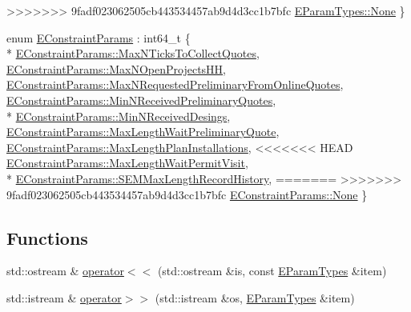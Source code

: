 \begin{DoxyCompactItemize}
>>>>>>> 9fadf023062505cb443534457ab9d4d3cc1b7bfc
\hyperlink{namespacesolar__core_aa1147341e5ef7a40d68d1bd68e149362a6adf97f83acf6453d4a6a4b1070f3754}{E\+Param\+Types\+::\+None}
 \}
\item 
enum \hyperlink{namespacesolar__core_ac827fdef4412a3c0d5e44d3f31908e49}{E\+Constraint\+Params} \+: int64\+\_\+t \{ \\*
\hyperlink{namespacesolar__core_ac827fdef4412a3c0d5e44d3f31908e49a79b059203dc39b55d85046f355d1fa95}{E\+Constraint\+Params\+::\+Max\+N\+Ticks\+To\+Collect\+Quotes}, 
\hyperlink{namespacesolar__core_ac827fdef4412a3c0d5e44d3f31908e49a5d0891420ec7c6769c9ece305c98daac}{E\+Constraint\+Params\+::\+Max\+N\+Open\+Projects\+H\+H}, 
\hyperlink{namespacesolar__core_ac827fdef4412a3c0d5e44d3f31908e49ae497930a8f22e14387bac31ebe737a64}{E\+Constraint\+Params\+::\+Max\+N\+Requested\+Preliminary\+From\+Online\+Quotes}, 
\hyperlink{namespacesolar__core_ac827fdef4412a3c0d5e44d3f31908e49a2e66c9bd577b41e92fd40c619a886559}{E\+Constraint\+Params\+::\+Min\+N\+Received\+Preliminary\+Quotes}, 
\\*
\hyperlink{namespacesolar__core_ac827fdef4412a3c0d5e44d3f31908e49a177186685b2d9651d26b48cb4ad61cc6}{E\+Constraint\+Params\+::\+Min\+N\+Received\+Desings}, 
\hyperlink{namespacesolar__core_ac827fdef4412a3c0d5e44d3f31908e49aa27f1df5083a611e423ed8531aad5cd3}{E\+Constraint\+Params\+::\+Max\+Length\+Wait\+Preliminary\+Quote}, 
\hyperlink{namespacesolar__core_ac827fdef4412a3c0d5e44d3f31908e49a343e282b2f49a70e6df068f1bca38402}{E\+Constraint\+Params\+::\+Max\+Length\+Plan\+Installations}, 
<<<<<<< HEAD
\hyperlink{namespacesolar__core_ac827fdef4412a3c0d5e44d3f31908e49a8c0f94b4a281d1e2221b3160596f4283}{E\+Constraint\+Params\+::\+Max\+Length\+Wait\+Permit\+Visit}, 
\\*
\hyperlink{namespacesolar__core_ac827fdef4412a3c0d5e44d3f31908e49ac75cfee3c5e5c1d3c4b15f53ab4cc718}{E\+Constraint\+Params\+::\+S\+E\+M\+Max\+Length\+Record\+History}, 
=======
>>>>>>> 9fadf023062505cb443534457ab9d4d3cc1b7bfc
\hyperlink{namespacesolar__core_ac827fdef4412a3c0d5e44d3f31908e49a6adf97f83acf6453d4a6a4b1070f3754}{E\+Constraint\+Params\+::\+None}
 \}
\end{DoxyCompactItemize}
\subsection*{Functions}
\begin{DoxyCompactItemize}
\item 
std\+::ostream \& \hyperlink{namespacesolar__core_aa8fea9dac434e9830aad9dea4f5ebf53}{operator$<$$<$} (std\+::ostream \&is, const \hyperlink{namespacesolar__core_aa1147341e5ef7a40d68d1bd68e149362}{E\+Param\+Types} \&item)
\item 
std\+::istream \& \hyperlink{namespacesolar__core_a82ed442d50159b64b565838515df1dba}{operator$>$$>$} (std\+::istream \&os, \hyperlink{namespacesolar__core_aa1147341e5ef7a40d68d1bd68e149362}{E\+Param\+Types} \&item)
\end{DoxyCompactItemize}


